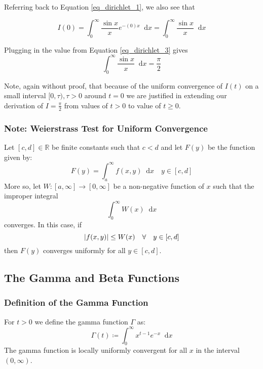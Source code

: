 \documentclass[11pt, a4paper]{article}
\newcommand{\diff}{\mathop{}\!\mathrm{d}} %
\begin{document}
Referring back to Equation \ref{eq_dirichlet_1}, we also see that

\begin{equation*}
I(0) = \int_{0}^{\infty}\frac{\sin x}{x}e^{-(0)x} \diff x =  \int_{0}^{\infty}\frac{\sin x}{x} \diff x
\end{equation*}

Plugging in the value from Equation \ref{eq_dirichlet_3} gives
\begin{equation*}
	\int_{0}^{\infty}\frac{\sin x}{x} \diff x = \frac{\pi}{2}
\end{equation*}

Note, again without proof, that because of the uniform convergence of $ I(t) $ on a small interval $ [0, \tau), \tau > 0$ around $t = 0 $ we are justified in extending our derivation of $ I = \frac{\pi}{2} $ from values of $ t > 0 $ to value of $ t \geq 0 $.


\subsubsection{Note: Weierstrass Test for Uniform Convergence}
Let $ [c, d] \in \mathbb{R}$ be finite constants such that $ c < d $ and let $ F(y) $ be the function given by:
\begin{equation*}
	F(y) = \int_{a}^{\infty}f(x, y)\diff x \quad y \in [c, d]
\end{equation*} 
More so, let $ W: [a, \infty] \rightarrow [0, \infty] $ be a non-negative function of $ x $ such that the improper integral
\begin{equation*}
	\int_{0}^{\infty} W(x) \diff x
\end{equation*}
converges. In this case, if
\begin{equation*}
	\abs{f(x, y)} \leq W(x) \quad \forall \quad y \in [c, d]
\end{equation*}
then $ F(y) $ converges uniformly for all $ y \in [c, d] $.

\subsection{The Gamma and Beta Functions}

\subsubsection{Definition of the Gamma Function}
For $ t > 0 $ we define the gamma function $ \Gamma $ as:
\begin{equation*}
	\Gamma(t) \coloneqq \int_{0}^{\infty}x^{t-1}e^{-x}\diff x
\end{equation*}
The gamma function is locally uniformly convergent for all $ x $ in the interval $ (0, \infty) $.
\end{document}

